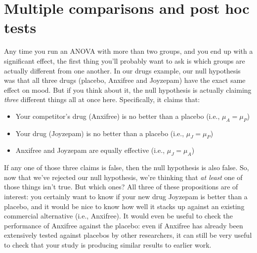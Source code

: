\section{Multiple comparisons and post hoc tests~\label{sec:posthoc}}





%
%


Any time you run an ANOVA with more than two groups, and you end up with a significant effect, the first thing you'll probably want to ask is which groups are actually different from one another. In our drugs example, our null hypothesis was that all three drugs (placebo, Anxifree and Joyzepam) have the exact same effect on mood. But if you think about it, the null hypothesis is actually claiming {\it three} different things all at once here. Specifically, it claims that:
\begin{itemize} \itemsep 0pt
\item Your competitor's drug (Anxifree) is no better than a placebo (i.e., $\mu_A = \mu_P$)
\item Your drug (Joyzepam) is no better than a placebo (i.e., $\mu_J = \mu_P$)
\item Anxifree and Joyzepam are equally effective (i.e., $\mu_J = \mu_A$)
\end{itemize}
If any one of those three claims is false, then the null hypothesis is also false. So, now that we've rejected our null hypothesis, we're thinking that {\it at least} one of those things isn't true. But which ones? All three of these propositions are of interest: you certainly want to know if your new drug Joyzepam is better than a placebo, and it would be nice to know how well it stacks up against an existing commercial alternative (i.e., Anxifree). It would even be useful to check the performance of Anxifree against the placebo: even if Anxifree has already been extensively tested against placebos by other researchers, it can still be very useful to check that your study is producing similar results to earlier work.

